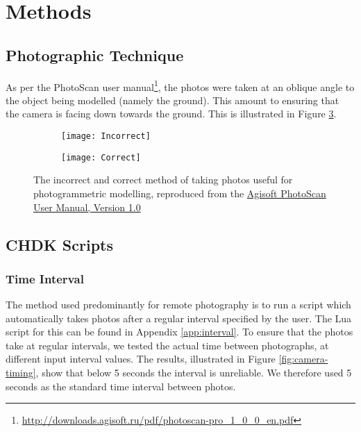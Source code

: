 \section{Methods}

\subsection{Photographic Technique}

As per the PhotoScan user
manual\footnote{\url{http://downloads.agisoft.ru/pdf/photoscan-pro_1_0_0_en.pdf}},
the photos were taken at an oblique angle to the object being modelled (namely
the ground). This amount to ensuring that the camera is facing down towards the
ground. This is illustrated in Figure \ref{img:photographic-method}.

\begin{figure}
    \centering
    \begin{subfigure}[b]{0.49\textwidth}
        \texttt{[image: Incorrect]}
        \label{img:incorrect}
    \end{subfigure}
    \begin{subfigure}[b]{0.49\textwidth}
        \texttt{[image: Correct]}
        \label{img:correct}
    \end{subfigure}
    \caption{The incorrect and correct method of taking photos useful for
        photogrammetric modelling, reproduced from the
        \href{http://downloads.agisoft.ru/pdf/photoscan-pro\_1\_0\_0\_en.pdf}{Agisoft
        PhotoScan User Manual, Version 1.0}}
    \label{img:photographic-method}
\end{figure}

\subsection{CHDK Scripts}

\subsubsection{Time Interval}

The method used predominantly for remote photography is to run a script which
automatically takes photos after a regular interval specified by the user. The
Lua script for this can be found in Appendix \ref{app:interval}. To ensure that
the photos take at regular intervals, we tested the actual time between
photographs, at different input interval values. The results, illustrated in
Figure \ref{fig:camera-timing}, show that below 5 seconds the interval is
unreliable. We therefore used 5 seconds as the standard time interval between
photos.

